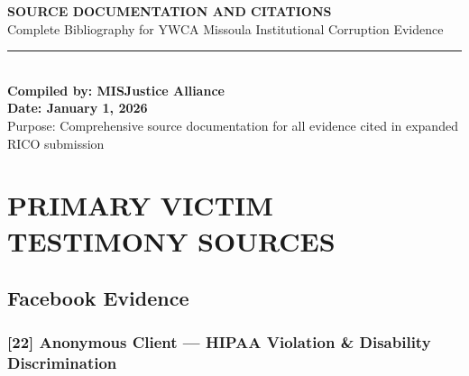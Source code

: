 \documentclass[11pt,letterpaper]{article}
\newcommand{\citeref}[1]{\textbf{\color{NavyBlue}[#1]}}
\begin{document}
\thispagestyle{firstpage}

\begin{center}
{\fontsize{20}{24}\selectfont\bfseries\color{NavyBlue}SOURCE DOCUMENTATION AND CITATIONS}\\[10pt]
{\large Complete Bibliography for YWCA Missoula Institutional Corruption Evidence}\\[16pt]
\textcolor{Gold}{\rule{4in}{1.5pt}}\\[14pt]
{\large\bfseries Compiled by: MISJustice Alliance}\\[4pt]
{\large\bfseries Date: January 1, 2026}\\[4pt]
{\large Purpose: Comprehensive source documentation for all evidence cited in expanded RICO submission}
\end{center}

\vspace{0.3in}

\tableofcontents
\newpage

\section{PRIMARY VICTIM TESTIMONY SOURCES}

\subsection{Facebook Evidence}

\subsubsection{\citeref{22} Anonymous Client --- HIPAA Violation \& Disability Discrimination}
\end{document}
